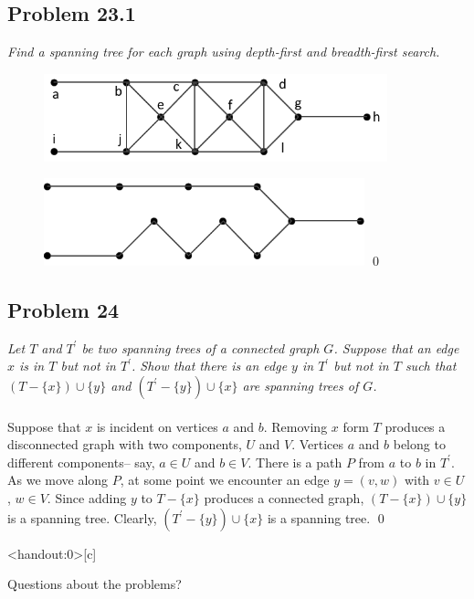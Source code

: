 \documentclass[
        ]{beamer}
\begin{document}
    \subsection{Problem 23.1}
        \begin{frame}[c]{\subsecname}
            \emph{Find a spanning tree for each graph using depth-first and breadth-first search.}\\
            \begin{figure}
                \centering
                \includegraphics[width=99.6mm]{tut11p23_1_1}
            \end{figure}\pause
            \begin{figure}
                \centering
                \includegraphics[width=93mm]{tut11p23_1_2} \qed
            \end{figure}
        \end{frame}



    \subsection{Problem 24}
        \begin{frame}[c]{\subsecname}
            \emph{Let $T$ and $T^\prime$ be two spanning trees of a connected graph $G$. Suppose that an edge $x$ is in $T$ but not in $T^\prime$. Show that there is an edge $y$ in $T^\prime$ but not in $T$ such that $( T - \{ x \} ) \cup \{ y \} $ and $(T^\prime - \{ y \} ) \cup \{ x \} $ are spanning trees of $G$.}\\$\;$\\\pause
            Suppose that $x$ is incident on vertices $a$ and $b$. Removing $x$ form $T$ produces a disconnected graph with two components, $U$ and $V$. Vertices $a$ and $b$ belong to different components\--- say, $a \in U$ and $b \in V$. There is a path $P$ from $a$ to $b$ in $T^\prime$. As we move along $P$, at some point we encounter an edge $y=(v,w)$ with $v \in U$, $w \in V$. Since adding $y$ to $T-\{x\}$ produces a connected graph, $(T-\{x\}) \cup \{y\}$ is a spanning tree. Clearly, $(T^\prime-\{y\}) \cup \{x\}$ is a spanning tree. \qed
        \end{frame}
    
    
    
    \begin{frame}<handout:0>[c]{\secname}
        \centerline{\Large{Questions about the problems?}}
    \end{frame}
    
    
    
\end{document}
